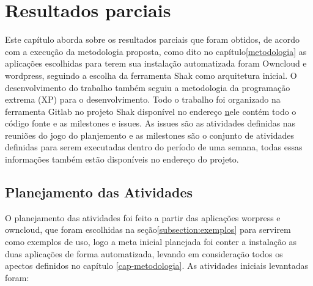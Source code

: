 \chapter{Resultados parciais}
\label{cap-resultados}

Este capítulo aborda sobre os resultados parciais que foram obtidos, de acordo
com a execução da metodologia proposta, como dito no capítulo\ref{metodologia}
as aplicações escolhidas para terem sua instalação automatizada foram Owncloud e
wordpress, seguindo a escolha da ferramenta Shak como arquitetura inicial. O
desenvolvimento do trabalho também seguiu a metodologia da programação extrema
(XP) para o desenvolvimento. Todo o trabalho foi organizado na ferramenta Gitlab
no projeto Shak disponível no endereço \href{https://gitlab.com/shak/shak/} nele
contém todo o código fonte e as milestones e issues. As issues são as atividades
definidas nas reuniões do jogo do planjemento e as milestones são o conjunto de
atividades definidas para serem executadas dentro do período de uma semana, todas
essas informações também estão disponíveis no endereço do projeto.

\section{Planejamento das Atividades}

O planejamento das atividades foi feito a partir das aplicações worpress e owncloud,
que foram escolhidas na seção\ref{subsection:exemplos} para servirem como exemplos
de uso, logo a meta inicial planejada foi conter a instalação as duas aplicações
de forma automatizada, levando em consideração todos os apectos definidos no capítulo
\ref{cap-metodologia}. As atividades iniciais levantadas foram:


